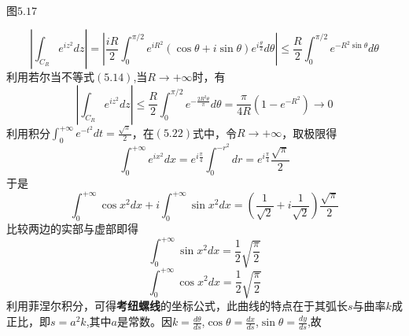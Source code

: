 \documentclass{report}
\begin{document}
\begin{center}
\\
图$5.17$
\end{center}
$$\left|\int_{C_{R}}e^{iz^{2}}dz\right|=\left|\frac{iR}{2}\int_{0}^{\pi/2}e^{iR^{2}}\left(\cos \theta+i\sin \theta\right)e^{i\frac{\theta}{2}}d\theta\right|\leqslant\frac{R}{2}\int_{0}^{\pi/2}e^{-R^{2}\sin \theta}d\theta$$
利用若尔当不等式$\left(5.14\right)$,当$R\rightarrow+\infty$时，有\\
$$\left|\int_{C_{R}}e^{iz^{2}}dz\right|\leqslant\frac{R}{2}\int_{0}^{\pi/2}e^{-\frac{2R^{2}\theta}{\pi}}d\theta=\frac{\pi}{4R}\left(1-e^{-R^{2}}\right)\rightarrow0$$
利用积分$\int_{0}^{+\infty}e^{-t^{2}}dt=\frac{\sqrt{\pi}}{2}$，在$\left(5.22\right)$式中，令$R\rightarrow+\infty$，取极限得
$$\int_{0}^{+\infty}e^{ix^{2}}dx=e^{i\frac{\pi}{4}}\int_{0}^{-r^{2}}dr=e^{i\frac{\pi}{4}}\frac{\sqrt{\pi}}{2}$$
于是
$$\int_{0}^{+\infty}\cos x^{2}dx+i\int_{0}^{+\infty}\sin x^{2}dx=\left(\frac{1}{\sqrt{2}}+i\frac{1}{\sqrt{2}}\right)\frac{\sqrt{\pi}}{2}$$
比较两边的实部与虚部即得
$$\int_{0}^{+\infty}\sin x^{2}dx=\frac{1}{2}\sqrt{\frac{\pi}{2}}$$
$$\int_{0}^{+\infty}\cos x^{2}dx=\frac{1}{2}\sqrt{\frac{\pi}{2}}$$
\qquad 利用菲涅尔积分，可得\textbf{考纽螺线}的坐标公式，此曲线的特点在于其弧长$s$与曲率$k$成正比，即$s=a^{2}k$,其中$a$是常数。因$k=\frac{d\theta}{ds}$,$\cos \theta=\frac{dx}{ds}$,$\sin \theta=\frac{dy}{ds}$,故
\end{document}
